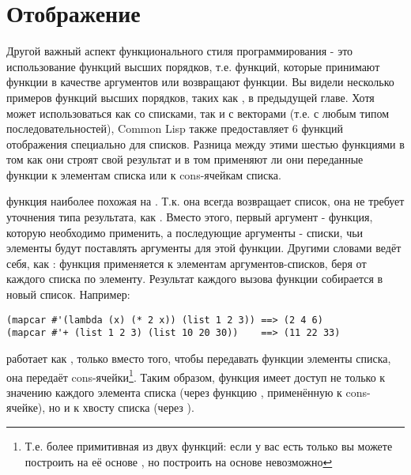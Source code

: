 \section{Отображение}
\label{sec:12-map}

Другой важный аспект функционального стиля программирования - это использование функций
высших порядков, т.е. функций, которые принимают функции в качестве аргументов или
возвращают функции. Вы видели несколько примеров функций высших порядков, таких как
, в предыдущей главе. Хотя  может использоваться как со списками, так
и с векторами (т.е. с любым типом последовательностей), Common Lisp также предоставляет 6
функций отображения специально для списков. Разница между этими шестью функциями в том как
они строят свой результат и в том применяют ли они переданные функции к элементам списка
или к cons-ячейкам списка.

 функция наиболее похожая на . Т.к. она всегда возвращает список,
она не требует уточнения типа результата, как . Вместо этого, первый аргумент
 - функция, которую необходимо применить, а последующие аргументы - списки,
чьи элементы будут поставлять аргументы для этой функции. Другими словами 
ведёт себя, как : функция применяется к элементам аргументов-списков, беря от
каждого списка по элементу. Результат каждого вызова функции собирается в новый
список. Например:

\begin{lstlisting}
(mapcar #'(lambda (x) (* 2 x)) (list 1 2 3)) ==> (2 4 6)
(mapcar #'+ (list 1 2 3) (list 10 20 30))    ==> (11 22 33)
\end{lstlisting}

 работает как , только вместо того, чтобы передавать функции
элементы списка, она передаёт cons-ячейки\footnote{Т.е.  более примитивная
  из двух функций: если у вас есть только  вы можете построить на её основе
  , но построить  на основе  невозможно}.  Таким
образом, функция имеет доступ не только к значению каждого элемента списка (через функцию
, применённую к cons-ячейке), но и к хвосту списка (через ).

